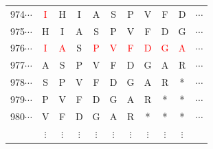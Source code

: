 \documentclass[phd,tocprelim]{cornell}
\begin{document}
\begin{table}[htp]
\begin{center}
{\begin{tabular}{|ccccccccccc|}
\small{974}$\cdots$ & \textcolor{red}{I} & H & I & A & S & P & V & F & D & $\cdots$ \\                                                                 
\small{975}$\cdots$ & H & I & A & S & P & V & F & D & G & $\cdots$ \\
\small{976}$\cdots$ & \textcolor{red}{I} & \textcolor{red}{A} & S & \textcolor{red}{P} & \textcolor{red}{V} & \textcolor{red}{F} & \textcolor{red}{D} & \textcolor{red}{G} & \textcolor{red}{A} &  $\cdots$ \\
\small{977}$\cdots$ & A & S & P & V & F & D & G & A & R & $\cdots$ \\
\small{978}$\cdots$ & S & P & V & F & D & G & A & R & * & $\cdots$ \\
\small{979}$\cdots$ & P & V & F & D & G & A & R & * & * & $\cdots$ \\
\small{980}$\cdots$ & V & F & D & G & A & R & * & * & * & $\cdots$ \\
 & $\vdots$ &  $\vdots$ &  $\vdots$ &  $\vdots$ & $\vdots$ &  $\vdots$ &  $\vdots$ &  $\vdots$&  $\vdots$ & \\
\hline
\end{tabular}
}
\end{center}
\end{table}
\end{document}
